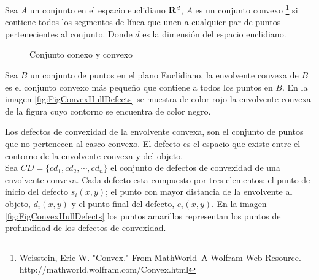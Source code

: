 Sea $A$ un conjunto en el espacio euclidiano $\bold{R}^d$, $A$ es un conjunto convexo \footnote{Weisstein, Eric W. "Convex." From MathWorld--A Wolfram Web Resource. http://mathworld.wolfram.com/Convex.html} si contiene todos los segmentos de línea que unen a cualquier par de puntos pertenecientes al conjunto. Donde $d$ es la dimensión del espacio euclidiano. 
\begin{figure}[h!]
\centering
{} \hspace{10mm}
 \hspace{10mm}
\caption{Conjunto conexo y convexo \footnotemark{}}\label{fig:Sets}
\end{figure} 
\footnotetext{}

Sea $B$ un conjunto de puntos en el plano Euclidiano, la envolvente convexa de $B$ es el conjunto convexo más pequeño que contiene a todos los puntos en $B$. En la imagen \ref{fig:FigConvexHullDefects} se muestra de color rojo la envolvente convexa de la figura cuyo contorno se encuentra de color negro. 

Los defectos de convexidad de la envolvente convexa, son el conjunto de puntos que no pertenecen al casco convexo. El defecto es el espacio que existe entre el contorno de la envolvente convexa y del objeto.\\
Sea $CD=\lbrace cd_1, cd_2, \cdots, cd_n \rbrace$ el conjunto de defectos de convexidad de una envolvente convexa. Cada defecto esta compuesto por tres elementos: el punto de inicio del defecto $s_i(x,y)$; el punto con mayor distancia de la envolvente al objeto, $d_i(x,y)$ y el punto final del defecto, $e_i(x,y)$.
En la imagen \ref{fig:FigConvexHullDefects} los puntos amarillos representan los puntos de profundidad de los defectos de convexidad. 


